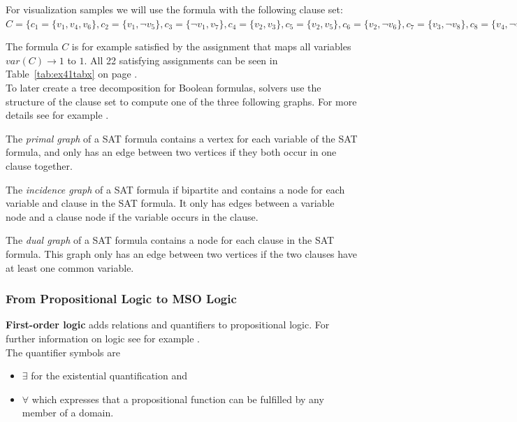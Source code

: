 \documentclass[a4paper, 12pt, bibliography=totoc]{scrartcl}
\begin{document}
\begin{example}\label{ex:example41}
	For visualization samples we will use the formula with the following clause set: $C=\{c_{1}=\{v_{1},v_{4},v_{6}\},
	c_{2}=\{v_{1},\neg v_{5}\},
	c_{3}=\{\neg v_{1},v_{7}\},
	c_{4}=\{v_{2},v_{3}\},
	c_{5}=\{v_{2},v_{5}\},
	c_{6}=\{v_{2},\neg v_{6}\},
	c_{7}=\{v_{3},\neg v_{8}\},
	c_{8}=\{v_{4},\neg v_{8}\},
	c_{9}=\{\neg v_{4},v_{6}\},
	c_{10}=\{\neg v_{4},v_{7}\}\}$
\end{example}

The formula $C$ is for example satisfied by the assignment that maps all variables $var(C)\rightarrow 1$ to $1$. 
All 22 satisfying assignments can be seen in Table~\ref{tab:ex41tabx} on page \pageref{tab:ex41tabx}.\\

To later create a tree decomposition for Boolean formulas, solvers use the structure of the clause set to compute one of the three following graphs.
For more details see for example \cite[Chapter~2.1]{DiplomarbeitZisser}.

The \textit{primal graph} of a SAT formula contains a vertex for each variable of the SAT formula, and only has an edge between two vertices if they both occur in one clause together.

The \textit{incidence graph} of a SAT formula if bipartite and contains a node for each variable and clause in the SAT formula. It only has edges between a variable node and a clause node if the variable occurs in the clause.

The \textit{dual graph} of a SAT formula contains a node for each clause in the SAT formula. This graph only has an edge between two vertices if the two clauses have at least one common variable.

\subsubsection{From Propositional Logic to MSO Logic}

\textbf{First-order logic} adds relations and quantifiers to propositional logic.
For further information on logic see for example \cite[Chapter~5]{HandbookMathGraph}. \\
The quantifier symbols are
\begin{itemize}
	\item $\exists$ for the existential quantification and
	\item $\forall$ which expresses that a propositional function can be fulfilled by any member of a domain.
\end{itemize}
\end{document}
